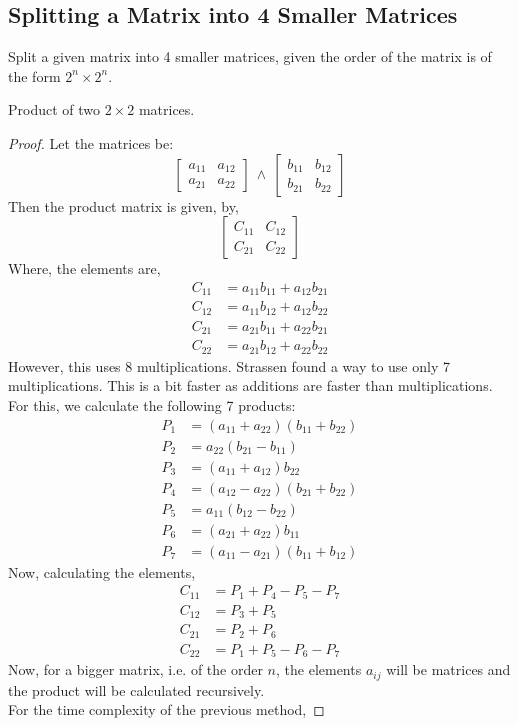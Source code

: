 \subsection{Splitting a Matrix into 4 Smaller Matrices}
\begin{eg}
	Split a given matrix into 4 smaller matrices, given the order of the matrix is of the form $2^n\times 2^n$.
\end{eg}
\begin{explanation}
	
\end{explanation}
\begin{theorem}
	Product of two $2\times 2$ matrices.
\end{theorem}
\begin{proof}
	Let the matrices be:\\
	\[\begin{bmatrix}a_{11}&a_{12}\\ a_{21}&a_{22}\end{bmatrix} \ \land \ \begin{bmatrix} b_{11}&b_{12}\\b_{21}&b_{22}\end{bmatrix}\]
	Then the product matrix is given, by,
	\[\begin{bmatrix} C_{11}& C_{12} \\ C_{21} & C_{22} \end{bmatrix}\]
	Where, the elements are,
	\[\begin{split}
			C_{11}&=a_{11}b_{11}+a_{12}b_{21} \\
			C_{12}&=a_{11}b_{12}+a_{12}b_{22}\\
			C_{21}&=a_{21}b_{11}+a_{22}b_{21}\\
			C_{22}&=a_{21}b_{12}+a_{22}b_{22}
		\end{split}\]
	However, this uses 8 multiplications. Strassen found a way to use only 7 multiplications. This is a bit faster as additions are faster than multiplications.
	For this, we calculate the following 7 products:
	\[\begin{split}
		P_1&=(a_{11}+a_{22})(b_{11}+b_{22})\\
		P_2&=a_{22}(b_{21}-b_{11})\\
		P_3&=(a_{11}+a_{12})b_{22}\\
		P_4&=(a_{12}-a_{22})(b_{21}+b_{22})\\
		P_5&=a_{11}(b_{12}-b_{22})\\
		P_6&=(a_{21}+a_{22})b_{11}\\
		P_7&=(a_{11}-a_{21})(b_{11}+b_{12})
	\end{split}\]
	Now, calculating the elements,
	\[\begin{split}
		C_{11}&=P_1+P_4-P_5-P_7\\
		C_{12}&=P_3+P_5\\
		C_{21}&=P_2+P_6\\
		C_{22}&=P_1+P_5-P_6-P_7
	\end{split}\]
	Now, for a bigger matrix, i.e. of the order $n$, the elements $a_{ij}$ will be matrices and the product will be calculated recursively.\\
	For the time complexity of the previous method,


\end{proof}
